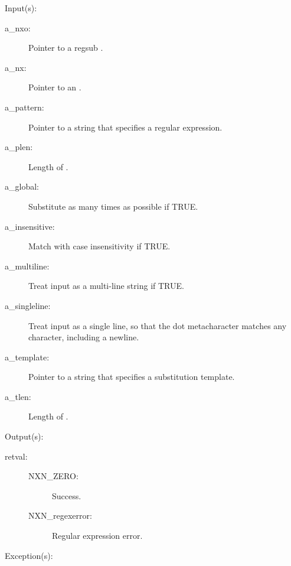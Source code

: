 \begin{capi}
\label{nxo_regsub_new}
	\begin{capilist}
	\item[Input(s): ]
		\begin{description}\item[]
		\item[a\_nxo: ]
			Pointer to a regsub .
		\item[a\_nx: ]
			Pointer to an .
		\item[a\_pattern: ]
			Pointer to a string that specifies a regular expression.
		\item[a\_plen: ]
			Length of .
		\item[a\_global: ]
			Substitute as many times as possible if TRUE.
		\item[a\_insensitive: ]
			Match with case insensitivity if TRUE.
		\item[a\_multiline: ]
			Treat input as a multi-line string if TRUE.
		\item[a\_singleline: ]
			Treat input as a single line, so that the dot
			metacharacter matches any character, including a
			newline.
		\item[a\_template: ]
			Pointer to a string that specifies a substitution
			template.
		\item[a\_tlen: ]
			Length of .
		\end{description}
	\item[Output(s): ]
		\begin{description}\item[]
		\item[retval: ]
			\begin{description}\item[]
			\item[NXN\_ZERO: ] Success.
			\item[NXN\_regexerror: ] Regular expression error.
			\end{description}
		\end{description}
	\item[Exception(s): ]
		\begin{description}\item[]

\end{description}
\end{capilist}
\end{capi}
